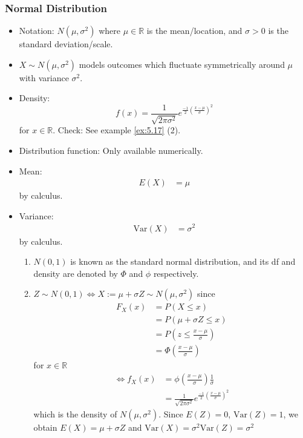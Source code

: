 \documentclass{article}
\newcommand{\R}{\mathbb{R}}
\newcommand{\Var}{\mathrm{Var}}
\begin{document}
			\subsubsection{Normal Distribution}
			\begin{itemize}
						\item Notation: $N(\mu, \sigma^2)$ where $\mu\in\R$ is the mean/location, and $\sigma>0$ is the standard deviation/scale.
						\item $X\sim N(\mu, \sigma^2)$ models outcomes which fluctuate symmetrically around $\mu$ with variance $\sigma^2$.
						\item Density: \[f(x)=\frac{1}{\sqrt{2\pi\sigma^2}}e^{\frac{-1}{2}(\frac{x-\mu}{\sigma})^2}\] for $x\in\R$.
						Check: See example \ref{ex:5.17} (2).
						\item Distribution function: Only available numerically.
						\item Mean:
						\begin{align*}
							E(X)&=\mu
						\end{align*}
						by calculus.
						\item Variance:
						\begin{align*}
							\Var(X)&=\sigma^2
						\end{align*}
						by calculus.
						\begin{myrem*}{}{}
							\begin{enumerate}
								\item $N(0, 1)$ is known as the standard normal distribution, and its df and density are denoted by $\Phi$ and $\phi$ respectively.
								
								\item $Z\sim N(0, 1)\Leftrightarrow X:=\mu+\sigma Z\sim N(\mu, \sigma^2)$ since
								\begin{align*}
									F_X(x)&=P(X\leq x)\\
									&=P(\mu+\sigma Z\leq x)\\
									&=P(z\leq\frac{x-\mu}{\sigma})\\
									&=\Phi(\frac{x-\mu}{\sigma})
								\end{align*}
								for $x\in\R$
								\begin{align*}
									\Leftrightarrow f_X(x)&=\phi(\frac{x-\mu}{\sigma})\frac{1}{\sigma}\\
									&=\frac{1}{\sqrt{2\pi\sigma^2}}e^{\frac{-1}{2}(\frac{x-\mu}{\sigma})^2}
								\end{align*}
								which is the density of $N(\mu, \sigma^2)$. Since $E(Z)=0$, $\Var(Z)=1$, we obtain $E(X)=\mu+\sigma Z$ and $\Var(X)=\sigma^2\Var(Z)=\sigma^2$
								

\end{enumerate}
\end{myrem*}
\end{itemize}
\end{document}
